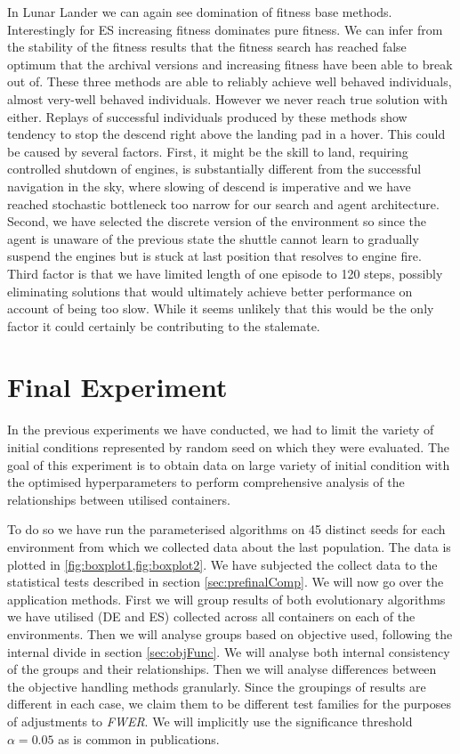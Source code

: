 In Lunar Lander we can again see domination of fitness base methods. Interestingly for ES increasing fitness dominates pure fitness. We can infer from the stability of the fitness results that the fitness search has reached false optimum that the archival versions and increasing fitness have been able to break out of. These three methods are able to reliably achieve well behaved individuals, almost very-well behaved individuals. However we never reach true solution with either. Replays of successful individuals produced by these methods show tendency to stop the descend right above the landing pad in a hover. This could be caused by several factors. First, it might be the skill to land, requiring controlled shutdown of engines, is substantially different from the successful navigation in the sky, where slowing of descend is imperative and we have reached stochastic bottleneck too narrow for our search and agent architecture. Second, we have selected the discrete version of the environment so since the agent is unaware of the previous state the shuttle cannot learn to gradually suspend the engines but is stuck at last position that resolves to engine fire. Third factor is that we have limited length of one episode to 120 steps, possibly eliminating solutions that would ultimately achieve better performance on account of being too slow. While it seems unlikely that this would be the only factor it could certainly be contributing to the stalemate.

\section{Final Experiment}
In the previous experiments we have conducted, we had to limit the variety of initial conditions represented by random seed on which they were evaluated. The goal of this experiment is to obtain data on large variety of initial condition with the optimised hyperparameters to perform comprehensive analysis of the relationships between utilised containers. 

To do so we have run the parameterised algorithms on 45 distinct seeds for each environment from which we collected data about the last population. The data is plotted in \cref{fig:boxplot1,fig:boxplot2}. We have subjected the collect data to the statistical tests described in section \ref{sec:prefinalComp}. We will now go over the application methods.
First we will group results of both evolutionary algorithms we have utilised (DE and ES) collected across all containers on each of the environments. Then we will analyse groups based on objective used, following the internal divide in section \ref{sec:objFunc}. We will analyse both internal consistency of the groups and their relationships. 
 Then we will analyse differences between the objective handling methods granularly.
 Since the groupings of results are different in each case, we claim them to be different test families for the purposes of adjustments to  \textit{FWER}. 
 We will implicitly use the significance threshold $\alpha = 0.05$ as is common in publications.

